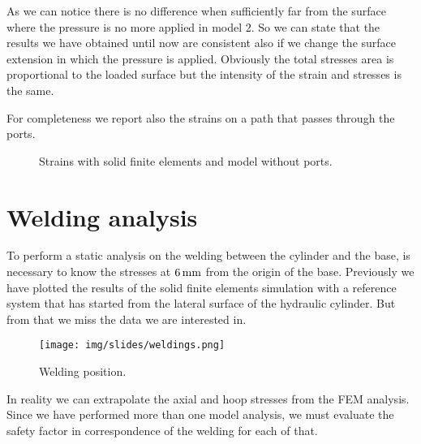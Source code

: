 \documentclass[a4paper,12pt]{article}
\begin{document}
As we can notice there is no difference when sufficiently far from the surface where the pressure is no more applied in model 2.
So we can state that the results we have obtained until now are consistent also if we change the surface extension in which the pressure is applied. Obviously the total stresses area is proportional to the loaded surface but the intensity of the strain and stresses is the same.

For completeness we report also the strains on a path that passes through the ports.

\begin{figure}[H]
\centering     %
\caption{Strains with solid finite elements and model without ports.}
\label{fig:solidmodel3_strain_bottom_ports}
\end{figure}




\section{Welding analysis}

To perform a static analysis on the welding between the cylinder and the base, is necessary to know the stresses at $6\,\text{mm}$ from the origin of the base. Previously we have plotted the results of the solid finite elements simulation with a reference system that has started from the lateral surface of the hydraulic cylinder. But from that we miss the data we are interested in.
\begin{figure}[H]
\centering
\texttt{[image: img/slides/weldings.png]}
\caption{Welding position.}
\label{fig:weldings}
\end{figure}
In reality we can extrapolate the axial and hoop stresses from the FEM analysis.
Since we have performed more than one model analysis, we must evaluate the safety factor in correspondence of the welding for each of that.
\end{document}
